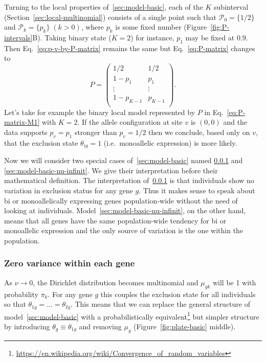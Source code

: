 \documentclass[letterpaper]{article}
\begin{document}
Turning to the local properties of~\ref{sec:model-basic}, each of the \(K\)
subinterval (Section~\ref{sec:local-multinomial}) consists of a single point
such that \(\mathcal{P}_0 = \{1/2\}\) and \(\mathcal{P}_k = \{p_k\} \;
(k>0)\), where \(p_k\) is some fixed number (Figure~\ref{fig:P-intervals}B).
Taking binary state (\(K=2\)) for instance, \(p_1\) may be fixed at \(0.9\).
Then Eq.~\ref{eq:p-v-by-P-matrix} remains the same but Eq.~\ref{eq:P-matrix}
changes to
\begin{equation}
\label{eq:P-matrix-M1}
P =
\begin{pmatrix}
1/2 & 1/2 \\
1-p_1 & p_1 \\
\vdots & \vdots \\
1-p_{K-1} & p_{K-1} \\
\end{pmatrix}.
\end{equation}
Let's take for example the binary local model represented by \(P\) in
Eq.~\ref{eq:P-matrix-M1} with \(K=2\).  If the allele configuration at site \(v\) is
\((0,0)\) and the data supports \(p_v=p_1\) stronger than \(p_v=1/2\) then we
conclude, based only on \(v\), that the exclusion state \(\theta_{ig}=1\)
(i.e.~monoallelic expression) is more likely.

Now we will consider two special cases of~\ref{sec:model-basic} named
\ref{sec:model-basic-nu-0} and \ref{sec:model-basic-nu-infinit}.  We give
their interpretation before their mathematical definition.  The interpretation
of~\ref{sec:model-basic-nu-0} is that individuals show no variation in
exclusion status for any gene \(g\).  Thus it makes sense to speak about bi or
monoallelically expressing genes population-wide without the need of looking
at individuals.  Model~\ref{sec:model-basic-nu-infinit}, on the other hand,
means that all genes have the same population-wide tendency for bi or
monoallelic expression and the only source of variation is the one within the
population.

\subsubsection{Zero variance within each gene}
\label{sec:model-basic-nu-0}

As \(\nu\rightarrow 0\), the Dirichlet distribution becomes multinomial and
\(\mu_{gk}\) will be 1 with probability \(\pi_k\).  For any gene \(g\) this
couples the exclusion state for all individuals so that
\(\theta_{1g}=...=\theta_{Ig}\).  This means that we can replace the general
structure of model~\ref{sec:model-basic} with a probabilistically
equivalent\footnote{
\url{https://en.wikipedia.org/wiki/Convergence_of_random_variables}} but
simpler structure by introducing \(\theta_g\equiv\theta_{1g}\) and removing
\(\mu_g\) (Figure~\ref{fig:plate-basic} middle).
\end{document}
